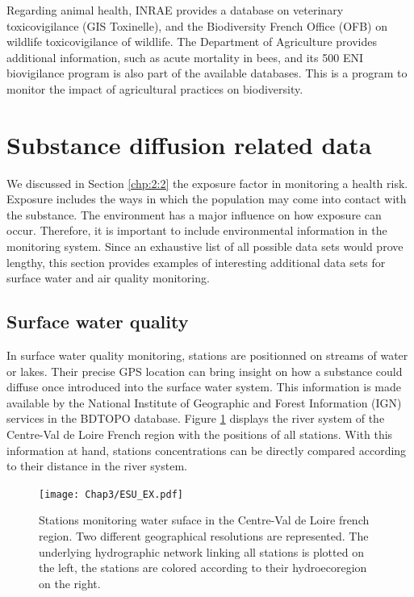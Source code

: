 Regarding animal health, INRAE provides a database on veterinary toxicovigilance (GIS Toxinelle), and the Biodiversity French Office (OFB) on wildlife toxicovigilance of wildlife. The Department of Agriculture provides additional information, such as acute mortality in bees, and its 500 ENI biovigilance program is also part of the available databases. This is a program to monitor the impact of agricultural practices on biodiversity.

\section{Substance diffusion related data}\label{chp:2:4}

We discussed in Section \ref{chp:2:2} the exposure factor in monitoring a health risk. Exposure includes the ways in which the population may come into contact with the substance. The environment has a major influence on how exposure can occur. Therefore, it is important to include environmental information in the monitoring system. Since an exhaustive list of all possible data sets would prove lengthy, this section provides examples of interesting additional data sets for surface water and air quality monitoring.

\subsection{Surface water quality}

In surface water quality monitoring, stations are positionned on streams of water or lakes.  Their precise GPS location can bring insight on how a substance could diffuse once introduced into the surface water system. This information is made available by the National Institute of Geographic and Forest Information (IGN) services in the BDTOPO database. Figure \ref{fig:esu_ex} displays the river system of the Centre-Val de Loire French region with the positions of all stations. With this information at hand, stations concentrations can be directly compared according to their distance in the river system.     

\begin{figure}[ht]
    \centering
    \texttt{[image: Chap3/ESU\_EX.pdf]}
    \caption{Stations monitoring water suface in the Centre-Val de Loire french region. Two different geographical resolutions are represented. The underlying hydrographic network linking all stations is plotted on the left, the stations are colored according to their hydroecoregion on the right.}
    \label{fig:esu_ex}
\end{figure}


